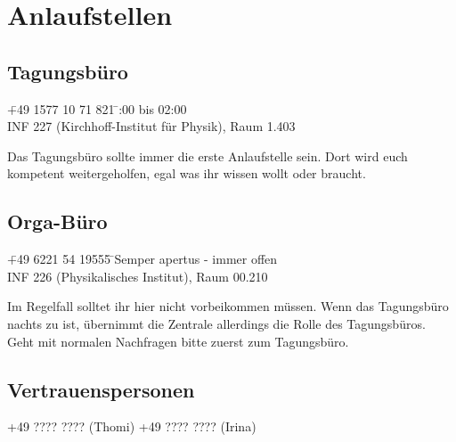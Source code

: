 
\section{Anlaufstellen}

\subsection{Tagungsbüro}
\begin{tabbing}
\faPhone \quad \quad \= +49 1577 10 71 821 \quad \quad \faClockO \= \quad {}:00 bis 02:00 \\ %
\faMapPin \> INF 227 (Kirchhoff-Institut für Physik), Raum 1.403 %
\end{tabbing}

\noindent Das Tagungsbüro sollte immer die erste Anlaufstelle sein. Dort wird euch kompetent weitergeholfen, egal was ihr wissen wollt oder braucht.

\subsection{Orga-Büro}
\begin{tabbing}
\faPhone \quad \quad \= +49 6221 54 19555 \quad \quad \faClockO \= \quad \quad  Semper apertus - immer offen\\
\faMapPin \> INF 226 (Physikalisches Institut), Raum 00.210
\end{tabbing}

\noindent Im Regelfall solltet ihr hier nicht vorbeikommen müssen. Wenn das Tagungsbüro nachts zu ist, übernimmt die Zentrale allerdings die Rolle des Tagungsbüros. Geht mit normalen Nachfragen bitte zuerst zum Tagungsbüro. %



\subsection{Vertrauenspersonen}
\faPhone \quad \quad +49 ???? ???? (Thomi) \quad \quad +49 ???? ???? (Irina) %

\noindent %
